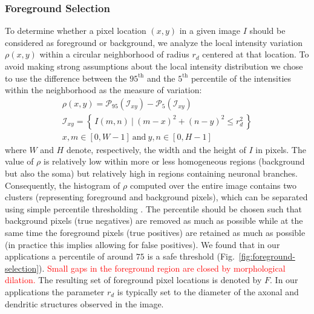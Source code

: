 \documentclass[twocolumn,natbib]{svjour3}
\newcommand{\marked}[1]{\textcolor{red}{#1}}
\begin{document}
\subsubsection{Foreground Selection}
\label{subsubsec:foreground-selection}
To determine whether a pixel location $(x,y)$ in a given image $I$ should be considered as foreground or background, we analyze the local intensity variation $\rho(x,y)$ within a circular neighborhood of radius $r_{d}$ centered at that location. To avoid making strong assumptions about the local intensity distribution we chose to use the difference between the $95^\textrm{th}$ and the $5^\textrm{th}$ percentile of the intensities within the neighborhood as the measure of variation:
\begin{gather} 
\rho(x,y) = \mathcal{P}_{95}(\mathcal{I}_{\!\!xy}) - \mathcal{P}_{5}(\mathcal{I}_{\!\!xy}) \\
\mathcal{I}_{\!\!xy} = \left\{\, I(m,n)\ |\ (m-x)^{2}+(n-y)^{2} \leq r_d^2\, \right\} \\
x,m \in [0,W-1]\ \textrm{and}\ y,n \in [0,H-1]
\end{gather}
where $W$ and $H$ denote, respectively, the width and the height of $I$ in pixels. The value of $\rho$ is relatively low within more or less homogeneous regions (background but also the soma) but relatively high in regions containing neuronal branches. Consequently, the histogram of $\rho$ computed over the entire image contains two clusters (representing foreground and background pixels), which can be separated using simple percentile thresholding \citep{doyle1962operations}. The percentile should be chosen such that background pixels (true negatives) are removed as much as possible while at the same time the foreground pixels (true positives) are retained as much as possible (in practice this implies allowing for false positives). We found that in our applications a percentile of around $75$ is a safe threshold (Fig.~\ref{fig:foreground-selection}). \marked{Small gaps in the foreground region are closed by morphological dilation.} The resulting set of foreground pixel locations is denoted by $F$. In our applications the parameter $r_{d}$ is typically set to the diameter of the axonal and dendritic structures observed in the image.
\end{document}
